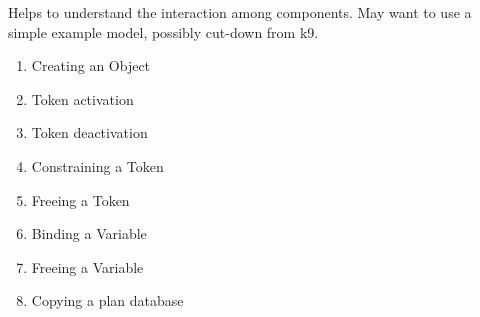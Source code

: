 \documentclass[10pt, letterpaper, twoside]{article}
\begin{document}

Helps to understand the interaction among components. May want to use
a simple example model, possibly cut-down from k9.
\begin{enumerate}
\item Creating an Object
\item Token activation
\item Token deactivation
\item Constraining a Token
\item Freeing a Token
\item Binding a Variable
\item Freeing a Variable
\item Copying a plan database
\end{enumerate}
\end{document}
